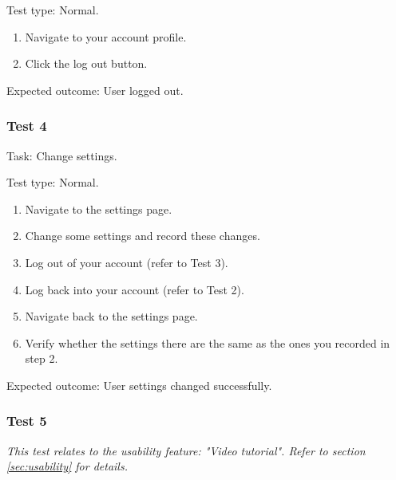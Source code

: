 {\color{gray} \hrulefill}

{\sffamily Test type: Normal.}\\

\begin{enumerate}
  \item Navigate to your account profile.
  \item Click the log out button.
\end{enumerate}

{\sffamily Expected outcome:} User logged out. \\ 

{\color{gray} \hrulefill}

\vspace{0.2cm}

\subsubsection{Test 4}

{\sffamily Task:} Change settings.\\ 

{\color{gray} \hrulefill}

{\sffamily Test type: Normal.}\\

\begin{enumerate}
  \item Navigate to the settings page.
  \item Change some settings and record these changes.
  \item Log out of your account (refer to Test 3). 
  \item Log back into your account (refer to Test 2).
  \item Navigate back to the settings page.
  \item Verify whether the settings there are the same as the ones you recorded in step 2.
\end{enumerate}

{\sffamily Expected outcome:} User settings changed successfully. \\

{\color{gray} \hrulefill}

\vspace{0.2cm}

\subsubsection{Test 5}

\textit{This test relates to the usability feature:
"Video tutorial". Refer to section
\ref{sec:usability} for details.} \\ \vspace{0.2cm}

